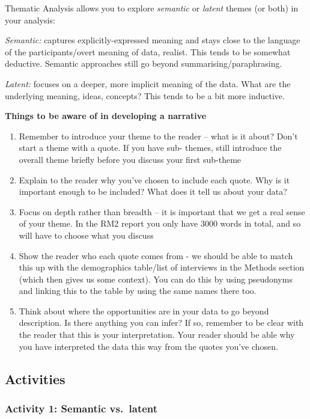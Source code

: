 \documentclass[
  english,
  letterpaper,
  DIV=11,
  numbers=noendperiod]{scrreprt}
\providecommand{\tightlist}{%
  \setlength{\itemsep}{0pt}\setlength{\parskip}{0pt}}
\begin{document}
Thematic Analysis allows you to explore \emph{semantic} or \emph{latent}
themes (or both) in your analysis:

\emph{Semantic:} captures explicitly-expressed meaning and stays close
to the language of the participants/overt meaning of data, realist. This
tends to be somewhat deductive. Semantic approaches still go beyond
summarising/paraphrasing.

\emph{Latent:} focuses on a deeper, more implicit meaning of the data.
What are the underlying meaning, ideas, concepts? This tends to be a bit
more inductive.

\textbf{Things to be aware of in developing a narrative}

\begin{enumerate}
\def\labelenumi{\arabic{enumi}.}
\tightlist
\item
  Remember to introduce your theme to the reader -- what is it about?
  Don't start a theme with a quote. If you have sub- themes, still
  introduce the overall theme briefly before you discuss your first
  sub-theme
\item
  Explain to the reader why you've chosen to include each quote. Why is
  it important enough to be included? What does it tell us about your
  data?
\item
  Focus on depth rather than breadth -- it is important that we get a
  real sense of your theme. In the RM2 report you only have 3000 words
  in total, and so will have to choose what you discuss
\item
  Show the reader who each quote comes from - we should be able to match
  this up with the demographics table/list of interviews in the Methods
  section (which then gives us some context). You can do this by using
  pseudonyms and linking this to the table by using the same names there
  too.
\item
  Think about where the opportunities are in your data to go beyond
  description. Is there anything you can infer? If so, remember to be
  clear with the reader that this is your interpretation. Your reader
  should be able why you have interpreted the data this way from the
  quotes you've chosen.
\end{enumerate}

\subsection{Activities}\label{activities-3}

\subsubsection{Activity 1: Semantic
vs.~latent}\label{activity-1-semantic-vs.-latent}
\end{document}
